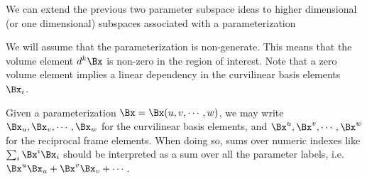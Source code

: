 %
%
We can extend the previous two parameter subspace ideas to higher dimensional (or one dimensional) subspaces associated with a parameterization

We will assume that the parameterization is non-generate.
This means that the
volume element \( d^k \Bx \) is non-zero in the region of interest.
Note that a zero volume element implies a linear dependency in the curvilinear basis elements \( \Bx_i \).

Given a parameterization \( \Bx = \Bx(u,v,\cdots, w) \), we may write
\( \Bx_u, \Bx_v, \cdots, \Bx_w \) for the curvilinear basis elements, and
\( \Bx^u, \Bx^v, \cdots, \Bx^w \) for the reciprocal frame elements.
When doing so, sums over numeric indexes like \( \sum_i \Bx^i \Bx_i \) should be interpreted as a sum over all the parameter labels, i.e. \( \Bx^u \Bx_u + \Bx^v \Bx_v + \cdots \).
